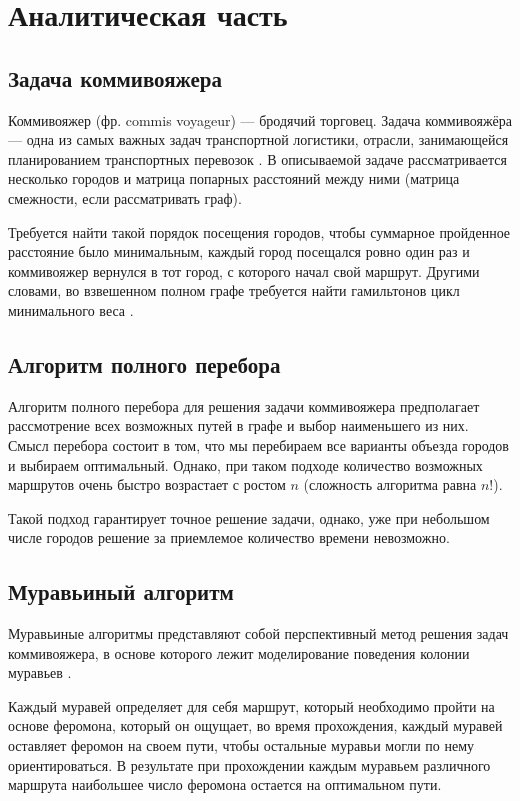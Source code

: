 \chapter{Аналитическая часть}
\section{Задача коммивояжера}
Коммивояжер (фр. commis voyageur) --- бродячий торговец. Задача коммивояжёра --- одна из самых важных задач транспортной логистики, отрасли, занимающейся планированием транспортных перевозок \cite{kommivoyazh}. В описываемой задаче рассматривается несколько городов и матрица попарных расстояний между ними (матрица смежности, если рассматривать граф). 

Требуется найти такой порядок посещения городов, чтобы суммарное пройденное расстояние было минимальным, каждый город посещался ровно один раз и коммивояжер вернулся в тот город, с которого начал свой маршрут. Другими словами, во взвешенном полном графе требуется найти гамильтонов цикл минимального веса \cite{gamilt}.


\section{Алгоритм полного перебора}
Алгоритм полного перебора для решения задачи коммивояжера предполагает рассмотрение всех возможных путей в графе и выбор наименьшего из них. Смысл перебора состоит в том, что мы перебираем все варианты объезда городов и выбираем оптимальный. Однако, при таком подходе количество возможных маршрутов очень быстро возрастает с ростом $n$ (сложность алгоритма равна $n!$).

Такой подход гарантирует точное решение задачи, однако, уже при небольшом числе городов решение за приемлемое количество времени невозможно.



\section{Муравьиный алгоритм}
Муравьиные алгоритмы представляют собой перспективный метод решения задач коммивояжера, в основе которого лежит моделирование поведения колонии муравьев \cite{Ulianov}.

Каждый муравей определяет для себя маршрут, который необходимо пройти на основе феромона, который он ощущает, во время прохождения, каждый муравей оставляет феромон на своем пути, чтобы остальные муравьи могли по нему ориентироваться. В результате при прохождении каждым муравьем различного маршрута наибольшее число феромона остается на оптимальном пути. 

